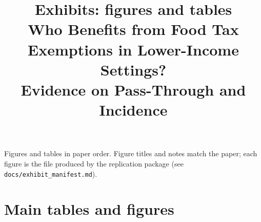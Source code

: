 \documentclass[12pt]{article}
\title{\vspace{-2cm}Exhibits: figures and tables\\[4pt]
\large Who Benefits from Food Tax Exemptions in Lower-Income Settings?\\
Evidence on Pass-Through and Incidence}
\date{}
\begin{document}
\maketitle
\thispagestyle{empty}
\vspace{-1cm}
\begin{center}\small Figures and tables in paper order. Figure titles and notes match the paper; each
figure is the file produced by the replication package (see \texttt{docs/exhibit\_manifest.md}).\end{center}
\clearpage

\section*{Main tables and figures}
\end{document}
